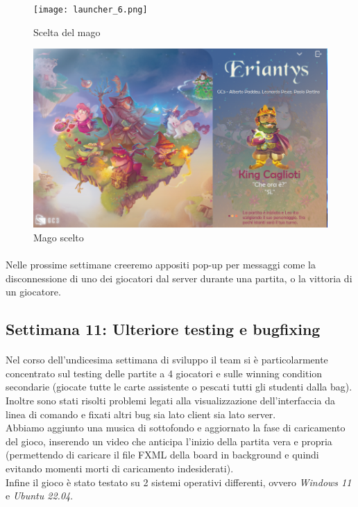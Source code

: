 \documentclass[a4paper, 12pt]{article}
\begin{document}
	\begin{figure}[!htb]
	\begin{minipage}{0.495\textwidth}
		\centering
		\texttt{[image: launcher\_6.png]}
		\caption{Scelta del mago}
	\end{minipage}\hfill
	\begin{minipage}{0.495\textwidth}
		\centering
		\includegraphics[width=\linewidth]{launcher_7.png}
		\caption{Mago scelto}
	\end{minipage}
	\end{figure}
	\paragraph{}
	Nelle prossime settimane creeremo appositi pop-up per messaggi come la disconnessione di uno dei giocatori dal server durante una partita, o la vittoria di un giocatore.
	
	\newpage
	\subsection{Settimana 11: Ulteriore testing e bugfixing}
	\paragraph{}
	Nel corso dell'undicesima settimana di sviluppo il team si è particolarmente concentrato sul testing delle partite a 4 giocatori e sulle winning condition secondarie (giocate tutte le carte assistente o pescati tutti gli studenti dalla bag).\\
	Inoltre sono stati risolti problemi legati alla visualizzazione dell'interfaccia da linea di comando e fixati altri bug sia lato client sia lato server.\\
	Abbiamo aggiunto una musica di sottofondo e aggiornato la fase di caricamento del gioco, inserendo un video che anticipa l'inizio della partita vera e propria (permettendo di caricare il file FXML della board in background e quindi evitando momenti morti di caricamento indesiderati).\\
	Infine il gioco è stato testato su 2 sistemi operativi differenti, ovvero \textit{Windows 11} e \textit{Ubuntu 22.04}.
\end{document}
